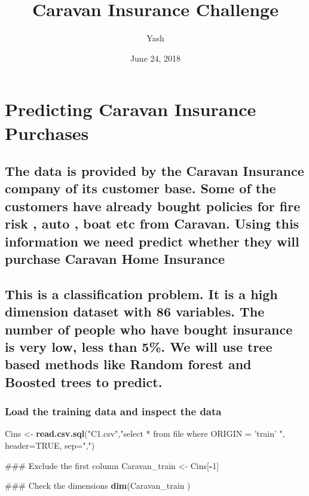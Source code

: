 \documentclass[]{article}
\title{Caravan Insurance Challenge}
\author{Yash}
\date{June 24, 2018}
\newenvironment{Shaded}{\begin{snugshade}}{\end{snugshade}}
\newcommand{\KeywordTok}[1]{\textcolor[rgb]{0.13,0.29,0.53}{\textbf{#1}}}
\newcommand{\DataTypeTok}[1]{\textcolor[rgb]{0.13,0.29,0.53}{#1}}
\newcommand{\DecValTok}[1]{\textcolor[rgb]{0.00,0.00,0.81}{#1}}
\newcommand{\StringTok}[1]{\textcolor[rgb]{0.31,0.60,0.02}{#1}}
\newcommand{\OtherTok}[1]{\textcolor[rgb]{0.56,0.35,0.01}{#1}}
\newcommand{\OperatorTok}[1]{\textcolor[rgb]{0.81,0.36,0.00}{\textbf{#1}}}
\newcommand{\NormalTok}[1]{#1}
\begin{document}
\maketitle

\section{Predicting Caravan Insurance
Purchases}\label{predicting-caravan-insurance-purchases}

\subsection{The data is provided by the Caravan Insurance company of its
customer base. Some of the customers have already bought policies for
fire risk , auto , boat etc from Caravan. Using this information we need
predict whether they will purchase Caravan Home
Insurance}\label{the-data-is-provided-by-the-caravan-insurance-company-of-its-customer-base.-some-of-the-customers-have-already-bought-policies-for-fire-risk-auto-boat-etc-from-caravan.-using-this-information-we-need-predict-whether-they-will-purchase-caravan-home-insurance}

\subsection{This is a classification problem. It is a high dimension
dataset with 86 variables. The number of people who have bought
insurance is very low, less than 5\%. We will use tree based methods
like Random forest and Boosted trees to
predict.}\label{this-is-a-classification-problem.-it-is-a-high-dimension-dataset-with-86-variables.-the-number-of-people-who-have-bought-insurance-is-very-low-less-than-5.-we-will-use-tree-based-methods-like-random-forest-and-boosted-trees-to-predict.}

\subsubsection{Load the training data and inspect the
data}\label{load-the-training-data-and-inspect-the-data}

\begin{Shaded}
\begin{Highlighting}[]
\NormalTok{Cins <-}\StringTok{  }\KeywordTok{read.csv.sql}\NormalTok{(}\StringTok{"C1.csv"}\NormalTok{,}\StringTok{"select * from file where ORIGIN = 'train' "}\NormalTok{, }\DataTypeTok{header=}\OtherTok{TRUE}\NormalTok{, }\DataTypeTok{sep=}\StringTok{","}\NormalTok{)}

\NormalTok{### Exclude the  first column }
\NormalTok{Caravan_train <-}\StringTok{ }\NormalTok{Cins[}\OperatorTok{-}\DecValTok{1}\NormalTok{]}


\NormalTok{### Check the dimensions}
\KeywordTok{dim}\NormalTok{(Caravan_train )}
\end{Highlighting}
\end{Shaded}
\end{document}
